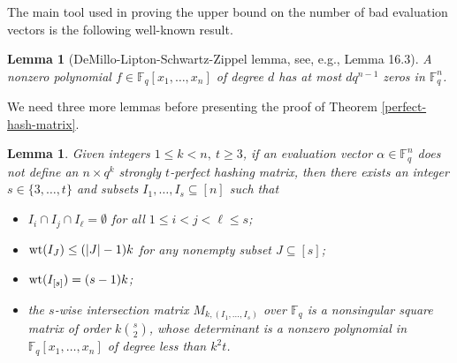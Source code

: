 \documentclass[11pt]{article}
\newtheorem{lemma}[theorem]{Lemma}
\begin{document}
The main tool used in proving the upper bound on the number of bad evaluation vectors is the following well-known result.

\begin{lemma}[DeMillo-Lipton-Schwartz-Zippel lemma, see, e.g., \cite{jukna2011extremal} Lemma 16.3]\label{zeros}
A nonzero polynomial $f\in\mathbb{F}_q[x_1,\ldots,x_n]$ of degree $d$ has at most $dq^{n-1}$ zeros  in $\mathbb{F}_q^n$.
\end{lemma}

We need three more lemmas before presenting the proof of Theorem \ref{perfect-hash-matrix}.

\begin{lemma}\label{main-lemma}
  Given integers $1\le k<n,~t\ge 3$, if  an evaluation vector $\alpha\in\mathbb{F}_q^n$ does not define an    $n\times q^k$ strongly $t$-perfect hashing matrix, then there exists an integer $s\in\{3,\ldots,t\}$ and subsets $I_1,\ldots,I_{s}\subseteq [n]$ such that
  \begin{itemize}
 \item [{\rm (i)}] $I_i\cap I_j\cap I_{\ell}=\emptyset$ for all $1\le i<j<\ell\le s$;
 \item [{\rm (ii)}] ${\rm wt}(I_{J})\leq (|J|-1)k$ for any nonempty subset $J\subseteq [s]$;
 \item [{\rm (iii)}] ${\rm wt}(I_{[s]})=(s-1)k$;
 \item [{\rm (iv)}] the $s$-wise intersection matrix $M_{k,(I_1,\ldots,I_{s})}$ over $\mathbb{F}_q$ is a nonsingular square matrix of order $k\binom{s}{2}$, whose determinant is a nonzero polynomial in $\mathbb{F}_q[x_1,\ldots,x_n]$ of degree less than $k^2t$.
\end{itemize}
\end{lemma}
\end{document}
